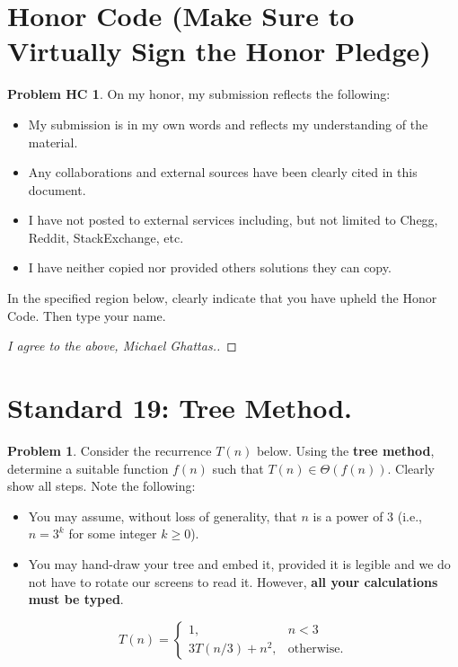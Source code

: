 \documentclass[11pt]{article}
\theoremstyle{definition}
\theoremstyle{definition}
\newtheorem{required}{Problem}
\newtheorem*{requiredHC}{Problem HC}
\theoremstyle{definition}
\begin{document}
\section*{Honor Code (Make Sure to Virtually Sign the Honor Pledge)} 
\hypertarget{HonorCode}{}

\begin{requiredHC}
On my honor, my submission reflects the following:
\begin{itemize}
\item My submission is in my own words and reflects my understanding of the material.
\item Any collaborations and external sources have been clearly cited in this document.
\item I have not posted to external services including, but not limited to Chegg, Reddit, StackExchange, etc.
\item I have neither copied nor provided others solutions they can copy.
\end{itemize}

\noindent In the specified region below, clearly indicate that you have upheld the Honor Code. Then type your name. 
\end{requiredHC}

\begin{proof}[I agree to the above, Michael Ghattas.]
\end{proof}



\newpage
\section{Standard 19: Tree Method.}

\begin{required}
Consider the recurrence $T(n)$ below. Using the {\bf tree method}, determine a suitable function $f(n)$ such that $T(n) \in \Theta(f(n))$. Clearly show all steps. Note the following:
\begin{itemize}
\item You may assume, without loss of generality, that $n$ is a power of $3$ (i.e., $n = 3^{k}$ for some integer $k \geq 0$).
\item You may hand-draw your tree and embed it, provided it is legible and we do not have to rotate our screens to read it. However, \textbf{all your calculations must be typed}.
\end{itemize}

\[
T(n) = \begin{cases} 1, &  n < 3 \\ 
3T(n/3) + n^{2}, &  \text{otherwise.} \end{cases}
\]

\end{required}
\end{document}

